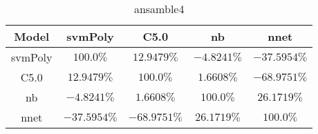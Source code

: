 \begin{table}[!ht]
	\centering
	\begin{tabular}{|c|c|c|c|c|}
		\hline
		Model & svmPoly & C5.0 & nb & nnet \\ \hline
		svmPoly & $100.0\%$ & $12.9479\%$ & $-4.8241\%$ & $-37.5954\%$ \\ \hline
		C5.0 & $12.9479\%$ & $100.0\%$ & $1.6608\%$ & $-68.9751\%$ \\ \hline
		nb & $-4.8241\%$ & $1.6608\%$ & $100.0\%$ & $26.1719\%$ \\ \hline
		nnet & $-37.5954\%$ & $-68.9751\%$ & $26.1719\%$ & $100.0\%$ \\ \hline
	\end{tabular}
	\caption{ansamble4}
	\label{tab:ansamble4}
\end{table}
